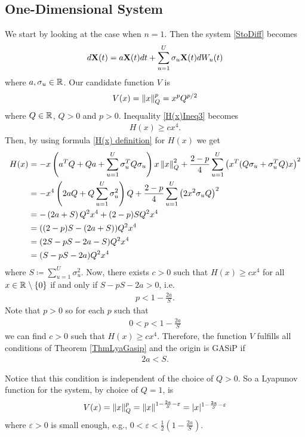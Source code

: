 \documentclass[a4paper,12pt,twoside,BCOR=10mm]{scrbook}
\begin{document}
\subsection{One-Dimensional System}
We start by looking at the case when $n = 1$. Then the system \eqref{StoDiff} becomes
\begin{align*}
    d\mathbf{X}(t) = a\mathbf{X}(t)dt + \sum_{u = 1}^U \sigma_u \mathbf{X}(t) dW_u(t)
\end{align*}
where $a, \sigma_u \in \mathbb{R}^{}$. Our candidate function $V$ is
\begin{align*}
    V(x) = \left\lVert x\right\rVert_Q^p = x^p Q^{p/2}
\end{align*}
where $Q\in \mathbb{R}^{}$, $Q > 0$ and $p > 0$. Inequality \eqref{H(x)Ineq3} becomes
\begin{align*}
    H(x) \geq cx^4.
\end{align*}
Then, by using formula \eqref{H(x) definition} for $H(x)$ we get
\begin{align*}
    H(x) &= -x\left(a^T Q + Qa + \sum_{u = 1}^U \sigma_u^T Q \sigma_u \right)x \left\lVert x\right\rVert_{Q}^{2} + \frac{2 - p}{4} \sum_{u = 1}^U \left(x^T (Q\sigma_u + \sigma_u^T Q) x\right)^2\\
    &= -x^4\left(2a Q + Q\sum_{u = 1}^U \sigma_u^2\right)Q + \frac{2 - p}{4} \sum_{u = 1}^U\left(2x^2\sigma_u Q\right)^2\\
    &= -\left(2a + S\right) Q^2x^4 + (2 - p)SQ^2x^4\\
    &= ((2-p)S - (2a + S))Q^2 x^4\\
    &= (2S - pS - 2a - S) Q^2 x^4\\
    &= (S - pS - 2a)Q^2 x^4
\end{align*}
where $S \coloneqq \sum\limits_{u = 1}^U \sigma_u^2$. Now, there exists $c > 0$ such that $H(x) \geq cx^4$ for all $x \in \mathbb{R}^{}\setminus \{0\}$ if and only if $S - pS - 2a > 0$, i.e.
\begin{align*}
    p < 1 - \frac{2a}{S}.
\end{align*}
Note that $p > 0$ so for each $p$ such that
\begin{align*}
    0 < p < 1 - \frac{2a}{S}
\end{align*}
we can find $c > 0$ such that $H(x) \geq cx^4$. Therefore, the function $V$ fulfills all conditions of Theorem \ref{ThmLyaGasip} and the origin is GASiP if
\begin{align*}
    2a < S.
\end{align*}

Notice that this condition is independent of the choice of $Q > 0$. So a Lyapunov function for the system, by choice of $Q = 1$, is
\begin{align*}
    V(x) = \left\lVert x\right\rVert_Q^p = \left\lVert x\right\rVert^{1 - \frac{2a}{S} - \varepsilon} = | x |^{1 - \frac{2a}{S} - \varepsilon}
\end{align*}
where $\varepsilon > 0$ is small enough, e.g., $0 < \varepsilon < \frac{1}{2}\left(1 - \frac{2a}{S}\right)$.
\end{document}
